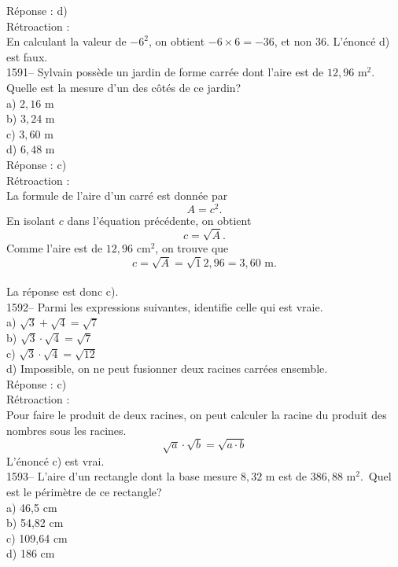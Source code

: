 R\'eponse : d)\\

R\'etroaction :\\
En calculant la valeur de $-6^2$, on obtient $-6\times6=-36$, et non
36.
L'\'enonc\'e d) est faux.\\

1591-- Sylvain poss\`ede un jardin de forme carr\'ee dont l'aire est
de $12,96{\textrm{ m}}^2.$\\ Quelle est la mesure d'un des c\^ot\'es de ce
jardin?\\
a) $2,16$ m\\
b) $3,24$ m\\
c) $3,60$ m\\
d) $6,48$ m\\

R\'eponse : c)\\

R\'etroaction :\\[3mm]
La formule de l'aire d'un carr\'e est donn\'ee par $$A=c^2.$$ En
isolant $c$ dans l'\'equation pr\'ec\'edente, on obtient $$c=\sqrt
A.$$ Comme l'aire est de $12,96{\textrm{ cm}}^2$, on trouve que
$$c=\sqrt A=\sqrt
12,96=3,60{\textrm{ m.}}$$\\ La r\'eponse est donc c).\\

1592-- Parmi les expressions suivantes, identifie celle qui est vraie.\\
a) $\sqrt 3+\sqrt 4=\sqrt 7$\\
b) $\sqrt 3\cdot\sqrt 4=\sqrt 7$\\
c) $\sqrt 3\cdot\sqrt 4=\sqrt {12}$\\
d) Impossible, on ne peut fusionner deux racines carr\'ees ensemble.\\

R\'eponse : c)\\

R\'etroaction :\\
Pour faire le produit de deux racines, on peut calculer la racine du
produit des nombres sous les racines. $$\sqrt a \cdot \sqrt b =
\sqrt {a\cdot b}$$ L'\'enonc\'e c)
est vrai.\\

1593-- L'aire d'un rectangle dont la base mesure $8,32{\textrm{ m}}$
est de $386,88{\textrm{ m}}^2.$\,
Quel est le p\'erim\`etre de ce rectangle?\\
a) 46,5 cm\\
b) 54,82 cm\\
c) 109,64 cm\\
d) 186 cm\\

